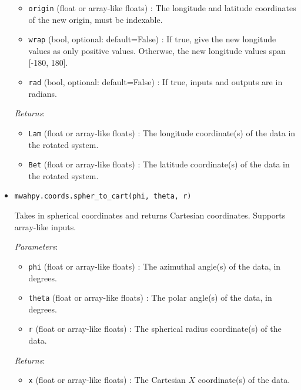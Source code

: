\documentclass{article}
\begin{document}
\begin{itemize}
\begin{itemize}
\item \verb!origin! (float or array-like floats) : The longitude and latitude coordinates of the new origin, must be indexable.

\item \verb!wrap! (bool, optional: default=False) : If true, give the new longitude values as only positive values. Otherwse, the new longitude values span [-180, 180]. 

\item \verb!rad! (bool, optional: default=False) : If true, inputs and outputs are in radians.

\end{itemize}

\textit{Returns}: \begin{itemize}

\item \verb!Lam! (float or array-like floats) : The longitude coordinate(s) of the data in the rotated system.

\item \verb!Bet! (float or array-like floats) : The latitude coordinate(s) of the data in the rotated system.

\end{itemize}



\item \verb!mwahpy.coords.spher_to_cart(phi, theta, r)!

Takes in spherical coordinates and returns Cartesian coordinates. Supports array-like inputs.

\textit{Parameters}: \begin{itemize}

\item \verb!phi! (float or array-like floats) : The azimuthal angle(s) of the data, in degrees.

\item \verb!theta! (float or array-like floats) : The polar angle(s) of the data, in degrees.

\item \verb!r! (float or array-like floats) : The spherical radius coordinate(s) of the data.

\end{itemize}

\textit{Returns}: \begin{itemize}

\item \verb!x! (float or array-like floats) : The Cartesian $X$ coordinate(s) of the data.


\end{itemize}
\end{itemize}
\end{document}

